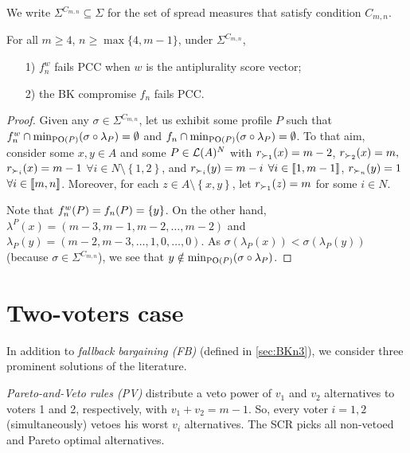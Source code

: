 
We write $\Sigma^{C_{m,n}} \subseteq \Sigma$ for the set of spread measures that satisfy condition $C_{m,n}$. 
\begin{theorem}
	For all $m\geq 4$, $n\geq \max\{4,m-1\}$, under $\Sigma^{C_{m,n}}$,
	\begin{itemize}
		\item [1)] $f_n^{w}$ fails \ac{PCC} when $w$ is the antiplurality score vector;
		\item [2)] the BK compromise  $f_n$ fails \ac{PCC}.
	\end{itemize}
\end{theorem}
\begin{proof}
	Given any $\sigma \in \Sigma^{C_{m,n}}$, let us exhibit some profile $P$ such that $f_n^{w} \cap \mustar = \emptyset$ and $f_n \cap \mustar = \emptyset$. To that aim, consider some $x,y\in A$ and some $P\in \mathcal{L}(A)^{N}$ with $r_{\prefi[1]}(x)=m-2$, $r_{\prefi[2]}(x)=m,$ $r_{\prefi}(x)=m-1$ $\forall i\in N \setminus \left\{ 1, 2\right\}$, and $r_{\prefi}(y)=m-i$ $\forall i\in \llbracket1,m-1\rrbracket$, $r_{\prefi[n]}(y)=1$ $\forall i\in \llbracket m,n\rrbracket$. Moreover, for each $z\in A \setminus \left\{ x,y\right\} $, let $r_{\prefi[1]}(z)=m$ for some $i\in N$. 
	
	Note that $f_n^{w}(P) = f_{n}(P) = \{y\}$. On the other hand, $\lambda^{P}(x)=(m-3, m-1,m-2,\dots,m-2)$ and $\lambda_{P}(y)=(m-2, m-3,\dots,1,0, \dots, 0)$. As $\sigma(\lambda_{P}(x)) < \sigma(\lambda_{P}(y))$ (because $\sigma \in \Sigma^{C_{m,n}}$), we see that $y\notin \mustar$.
\end{proof}

\section{Two-voters case}
In addition to \emph{fallback bargaining (FB)} \citep{Brams2001} (defined in \cref{sec:BKn3}), we consider three prominent solutions of the literature.

\emph{Pareto-and-Veto rules (PV)} \citep{Moulin1983, Abreu1991, Laslier2020} distribute a veto power of $v_1$ and $v_2$ alternatives to voters 1 and 2, respectively, with $v_1+v_2=m-1$. So, every voter $i=1,2$ (simultaneously) vetoes his worst $v_i$ alternatives. The \ac{SCR} picks all non-vetoed and Pareto optimal alternatives.

